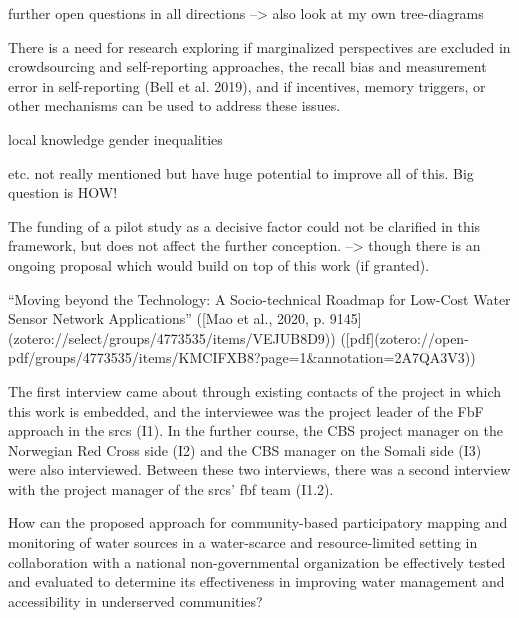 further open questions in all directions --> also look at my own tree-diagrams

There is a need for research exploring if marginalized perspectives are excluded in crowdsourcing and self-reporting approaches, the recall bias and measurement error in self-reporting (Bell et al. 2019), and if incentives, memory triggers, or other mechanisms can be used to address these issues.



local knowledge
gender inequalities

etc. not really mentioned but have huge potential to improve all of this. Big question is HOW!

The funding of a pilot study as a decisive factor could not be clarified in this framework, but does not affect the further conception. --> though there is an ongoing proposal which would build on top of this work (if granted).



“Moving beyond the Technology: A Socio-technical Roadmap for Low-Cost Water Sensor Network Applications” ([Mao et al., 2020, p. 9145](zotero://select/groups/4773535/items/VEJUB8D9)) ([pdf](zotero://open-pdf/groups/4773535/items/KMCIFXB8?page=1&annotation=2A7QA3V3))



The first interview came about through existing contacts of the project in which this work is embedded, and the interviewee was the project leader of the FbF approach in the \acrshort{srcs} (I1). In the further course, the CBS project manager on the Norwegian Red Cross side (I2) and the CBS manager on the Somali side (I3) were also interviewed. Between these two interviews, there was a second interview with the project manager of the \acrshort{srcs}' \acrshort{fbf} team (I1.2).




How can the proposed approach for community-based participatory mapping and monitoring of water sources in a water-scarce and resource-limited setting in collaboration with a national non-governmental organization be effectively tested and evaluated to determine its effectiveness in improving water management and accessibility in underserved communities?



